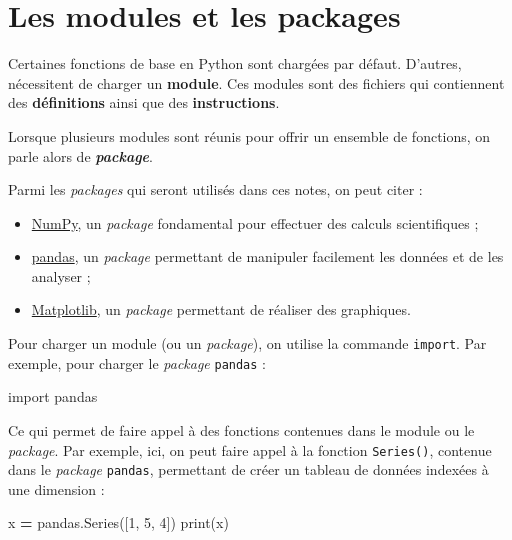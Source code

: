 \documentclass[
  12pt,
]{book}
\newenvironment{Shaded}{\begin{snugshade}}{\end{snugshade}}
\newcommand{\BuiltInTok}[1]{#1}
\newcommand{\DecValTok}[1]{\textcolor[rgb]{0.00,0.00,0.81}{#1}}
\newcommand{\ImportTok}[1]{#1}
\newcommand{\NormalTok}[1]{#1}
\newcommand{\OperatorTok}[1]{\textcolor[rgb]{0.81,0.36,0.00}{\textbf{#1}}}
\providecommand{\tightlist}{%
  \setlength{\itemsep}{0pt}\setlength{\parskip}{0pt}}
\numberwithin{equation}{section}
\numberwithin{countremarque}{section}
\begin{document}
\section{Les modules et les packages}\label{les-modules-et-les-packages}

Certaines fonctions de base en Python sont chargées par défaut. D'autres, nécessitent de charger un \textbf{module}. Ces modules sont des fichiers qui contiennent des \textbf{définitions} ainsi que des \textbf{instructions}.

Lorsque plusieurs modules sont réunis pour offrir un ensemble de fonctions, on parle alors de \emph{\textbf{package}}.

Parmi les \emph{packages} qui seront utilisés dans ces notes, on peut citer :

\begin{itemize}
\tightlist
\item
  \href{http://www.numpy.org/}{NumPy}, un \emph{package} fondamental pour effectuer des calculs scientifiques ;
\item
  \href{https://pandas.pydata.org/}{pandas}, un \emph{package} permettant de manipuler facilement les données et de les analyser ;
\item
  \href{https://matplotlib.org/}{Matplotlib}, un \emph{package} permettant de réaliser des graphiques.
\end{itemize}

Pour charger un module (ou un \emph{package}), on utilise la commande \texttt{import}. Par exemple, pour charger le \emph{package} \texttt{pandas} :

\begin{Shaded}
\begin{Highlighting}[]
\ImportTok{import}\NormalTok{ pandas}
\end{Highlighting}
\end{Shaded}

Ce qui permet de faire appel à des fonctions contenues dans le module ou le \emph{package}. Par exemple, ici, on peut faire appel à la fonction \texttt{Series()}, contenue dans le \emph{package} \texttt{pandas}, permettant de créer un tableau de données indexées à une dimension :

\begin{Shaded}
\begin{Highlighting}[]
\NormalTok{x }\OperatorTok{=}\NormalTok{ pandas.Series([}\DecValTok{1}\NormalTok{, }\DecValTok{5}\NormalTok{, }\DecValTok{4}\NormalTok{])}
\BuiltInTok{print}\NormalTok{(x)}
\end{Highlighting}
\end{Shaded}
\end{document}
